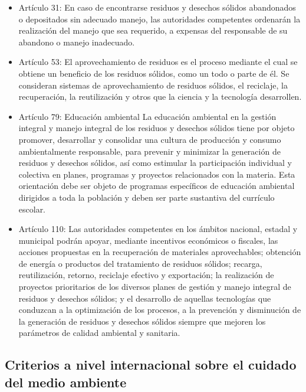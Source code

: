\begin{itemize}
    \item Artículo 31: En caso de encontrarse residuos y desechos sólidos abandonados o depositados sin adecuado manejo, las autoridades competentes ordenarán la realización del manejo que sea requerido, a expensas del responsable de su abandono o manejo inadecuado.

    \item Artículo 53: El aprovechamiento de residuos es el proceso mediante el cual se obtiene un beneficio de los residuos sólidos, como un todo o parte de él. Se consideran sistemas de aprovechamiento de residuos sólidos, el reciclaje, la recuperación, la reutilización y otros que la ciencia y la tecnología desarrollen.
    
    \item Artículo 79: Educación ambiental La educación ambiental en la gestión integral y manejo integral de los residuos y desechos sólidos tiene por objeto promover, desarrollar y consolidar una cultura de producción y consumo ambientalmente responsable, para prevenir y minimizar la generación de residuos y desechos sólidos, así como estimular la participación individual y colectiva en planes, programas y proyectos relacionados con la materia. Esta orientación debe ser objeto de programas específicos de educación ambiental dirigidos a toda la población y deben ser parte sustantiva del currículo escolar.
    
    \item Artículo 110: Las autoridades competentes en los ámbitos nacional, estadal y municipal podrán apoyar, mediante incentivos económicos o fiscales, las acciones propuestas en la recuperación de materiales aprovechables; obtención de energía o productos del tratamiento de residuos sólidos; recarga, reutilización, retorno, reciclaje efectivo y exportación; la realización de proyectos prioritarios de los diversos planes de gestión y manejo integral de residuos y desechos sólidos; y el desarrollo de aquellas tecnologías que conduzcan a la optimización de los procesos, a la prevención y disminución de la generación de residuos y desechos sólidos siempre que mejoren los parámetros de calidad ambiental y sanitaria.
\end{itemize}

\subsection {Criterios a nivel internacional sobre el cuidado del medio ambiente}

